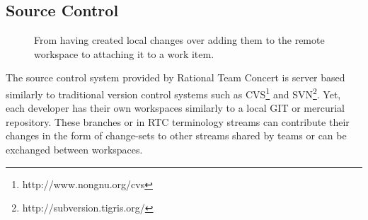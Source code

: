 \subsection{Source Control}
\begin{figure}
\centering
{}


\caption{From having created local changes over adding them to the remote workspace to attaching it to a work item.}
\label{fig:change-set}
\end{figure}

The source control system provided by Rational Team Concert is server based similarly to traditional version control systems such as CVS\footnote{http://www.nongnu.org/cvs} and SVN\footnote{http://subversion.tigris.org/}.
Yet, each developer has their own workspaces similarly to a local GIT or mercurial repository.
These branches or in RTC terminology streams can contribute their changes in the form of change-sets to other streams shared by teams or can be exchanged between workspaces.

